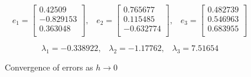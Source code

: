 \documentclass{article}
\begin{document}
\begin{equation}
 \label{eq:mat}
e_{1} = \begin{bmatrix}
     0.42509 \\[0.3em]
     -0.829153 \\[0.3em]
     0.363048 \\[0.3em]
       \end{bmatrix}\text{,}\quad
e_{2} = \begin{bmatrix}
     0.765677 \\[0.3em]
     0.115485 \\[0.3em]
     -0.632774 \\[0.3em]
       \end{bmatrix}\text{,}\quad
e_{3} = \begin{bmatrix}
     0.482739 \\[0.3em]
     0.546963 \\[0.3em]
     0.683955 \\[0.3em]
       \end{bmatrix}
\end{equation}

\begin{equation}
 \label{eq:mat}
\lambda_{1} = -0.338922 \text{,}\quad
\lambda_{2} = -1.17762 \text{,}\quad
\lambda_{3} = 7.51654
\end{equation}

\begin{figure}[H]
  \begin{center}
  \end{center}
  \caption{Convergence of errors as $h\to 0$}
  \label{fig:mag_susc}
\end{figure}
\end{document}
